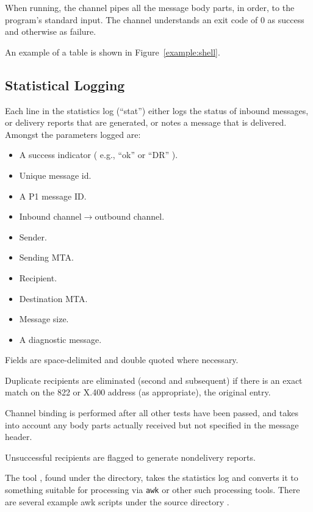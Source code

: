 
When running, the  channel pipes all the message body parts, in
order, to the program's standard input.
The  channel understands an exit code of 0 as success and
otherwise as failure.

An example of a  table is shown in Figure~\ref{example:shell}.


\subsection{Statistical Logging}

Each line in the statistics log (``stat'') either logs the status of
inbound messages, or delivery reports that are generated, or notes a
message that is delivered. Amongst the parameters logged are:
\begin{itemize}
\item	A success indicator ( e.g., ``ok'' or ``DR'' ).
\item	Unique message id.
\item	A P1 message ID.
\item	Inbound channel$\rightarrow$outbound channel.
\item	Sender.
\item	Sending MTA.
\item	Recipient.
\item	Destination MTA.
\item	Message size.
\item	A diagnostic message.
\end{itemize}

Fields are space-delimited and double quoted where necessary.

Duplicate recipients are eliminated (second and subsequent) if there
is an exact match on the 822 or X.400 address (as appropriate),  the
original entry.

Channel binding is performed after all other tests have been passed, and
takes into account any body parts actually received but not specified in the
message header.

Unsuccessful recipients are flagged to generate nondelivery reports.

The tool , found under the  directory, takes
the statistics log and converts it to something suitable for
processing via \verb+awk+ or other such processing tools.
There are several example awk scripts under the source directory
.
